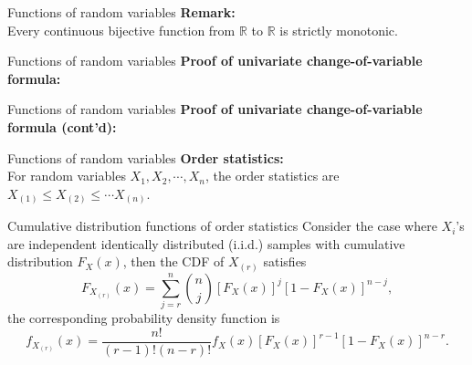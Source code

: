 \documentclass [aspectratio=169]{beamer}
\begin{document}
\begin{frame}{Functions of random variables}
\textbf{Remark:}\\
Every continuous bijective function from $\mathbb{R}$ to $\mathbb{R}$ is strictly monotonic. \\
\vspace{0.1in}
\end{frame}

\begin{frame}{Functions of random variables}
\textbf{Proof of univariate change-of-variable formula:}
\vspace{2.5in}
\end{frame}

\begin{frame}{Functions of random variables}
\textbf{Proof of univariate change-of-variable formula (cont'd):}
\vspace{2.5in}
\end{frame}


\begin{frame}{Functions of random variables}
\textbf{Order statistics:}\\
For random variables $X_1, X_2, \cdots, X_n$, the order statistics are $X_{(1)} \le X_{(2)} \le \cdots X_{(n)}$.\\

\begin{block}{Cumulative distribution functions of order statistics}
Consider the case where $X_i$'s are independent identically distributed (i.i.d.) samples with cumulative distribution ${\displaystyle F_{X}(x)}$, then the CDF of $X_{(r)}$ satisfies
$$
{\displaystyle F_{X_{(r)}}(x)=\sum _{j=r}^{n}{\binom {n}{j}}[F_{X}(x)]^{j}[1-F_{X}(x)]^{n-j}},
$$
the corresponding probability density function is
$$
{\displaystyle f_{X_{(r)}}(x)={\frac {n!}{(r-1)!(n-r)!}}f_{X}(x)[F_{X}(x)]^{r-1}[1-F_{X}(x)]^{n-r}.}
$$
\end{block}
\end{frame}
\end{document}
